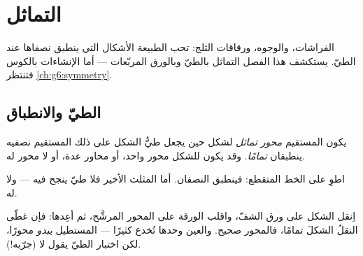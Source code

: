 \chapter{التماثل}\label{ch:g4:symmetry}

الفراشات، والوجوه، ورقاقات الثلج: تحب الطبيعة الأشكال التي
ينطبق نصفاها عند الطيّ. يستكشف هذا الفصل التماثل بالطيّ وبالورق
المربّعات --- أما الإنشاءات بالكوس فتنتظر
\cref{ch:g6:symmetry}.

\section{الطيّ والانطباق}

\begin{definition}\label{def:g4:symmetry:def}
يكون المستقيم \emph{محور تماثل} لشكل
حين يجعل طيُّ الشكل على ذلك المستقيم نصفيه ينطبقان
\emph{تمامًا}. وقد يكون للشكل محور واحد، أو محاور عدة، أو لا
محور له.
\end{definition}

\begin{omfigure}

{\small اطوِ على الخط المتقطع: فينطبق النصفان. أما المثلث
الأخير فلا طيّ ينجح فيه --- ولا  له.}
\end{omfigure}

\begin{example}\label{ex:g4:symmetry:trace}
اِنقل الشكل على ورق الشفّ، واقلب الورقة على المحور المرشَّح،
ثم أعِدها: فإن غطّى النقلُ الشكلَ تمامًا، فالمحور
صحيح. والعين وحدها تُخدع كثيرًا ---  المستطيل
\emph{يبدو} محورًا، لكن اختبار الطيّ يقول لا (جرّبه!).
\end{example}

